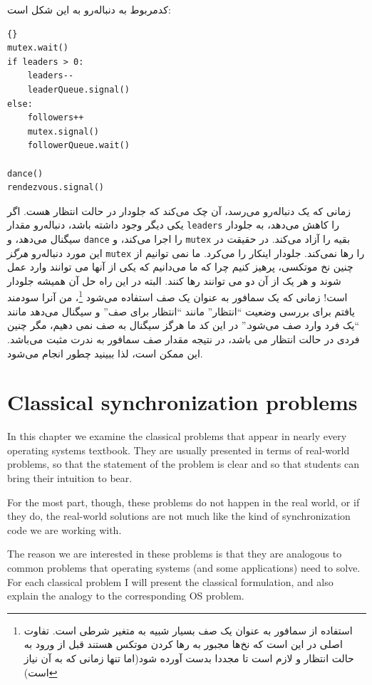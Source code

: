 \documentclass{book}
\newcommand{\clearemptydoublepage}{\newpage\cleardoublepage}
\begin{document}
کدمربوط به دنباله‌رو به این شکل است:

\begin{latin}
\begin{latin}
\begin{lstlisting}[title={Queue solution (followers)}]{}
mutex.wait()
if leaders > 0:
    leaders--
    leaderQueue.signal()
else:
    followers++
    mutex.signal()
    followerQueue.wait()    

dance()
rendezvous.signal()
\end{lstlisting}
\end{latin}
\end{latin}
زمانی که یک دنباله‌رو می‌رسد، آن چک می‌کند که جلو‌دار در حالت انتظار هست. اگر یکی دیگر وجود داشته باشد، دنباله‌رو مقدار {\tt leaders} را کاهش می‌دهد، به جلودار سیگنال می‌دهد، و {\tt dance} را اجرا می‌کند، و {\tt mutex} بقیه را آزاد می‌کند. در حقیقت در این مورد دنباله‌رو {\em هرگز} {\tt mutex} را رها نمی‌کند. جلو‌دار اینکار را می‌کرد. ما نمی توانیم از چنین نخ موتکسی، پرهیز کنیم چرا که ما می‌دانیم که یکی از آنها می توانند وارد عمل شوند و هر یک از آن دو می توانند رها کنند. البته در این راه حل آن همیشه جلو‌دار است!
زمانی که یک سمافور به عنوان یک صف استفاده می‌شود
\footnote{استفاده از سمافور به عنوان یک صف بسیار شبیه به متغیر شرطی است. تفاوت اصلی در این است که نخ‌ها مجبور به رها کردن موتکس هستند قبل از ورود به حالت انتظار و لازم است تا مجددا بدست آورده شود(اما تنها زمانی که به آن نیاز است)}،
من آنرا سودمند یافتم برای بررسی وضعیت ``انتظار'' مانند ``انتظار برای صف'' و سیگنال می‌دهد مانند ``یک فرد وارد صف می‌شود.''
در این کد ما هرگز سیگنال به صف نمی دهیم، مگر چنین فردی در حالت انتظار می باشد، در نتیجه مقدار صف سمافور‌ به ندرت مثبت می‌باشد. این ممکن است، لذا ببینید چطور انجام می‌شود.


\clearemptydoublepage
\chapter{Classical synchronization problems}

In this chapter we examine the classical problems that appear
in nearly every operating systems textbook.  They
are usually presented in terms of real-world problems, so
that the statement of the problem is clear and so that students
can bring their intuition to bear.

For the most part, though, these problems do not happen in the
real world, or if they do, the real-world solutions are not much
like the kind of synchronization code we are working with.

The reason we are interested in these problems
is that they are analogous to common problems that operating
systems (and some applications) need to solve.  For each classical
problem I will present the classical formulation, and also explain
the analogy to the corresponding OS problem.
\end{document}
